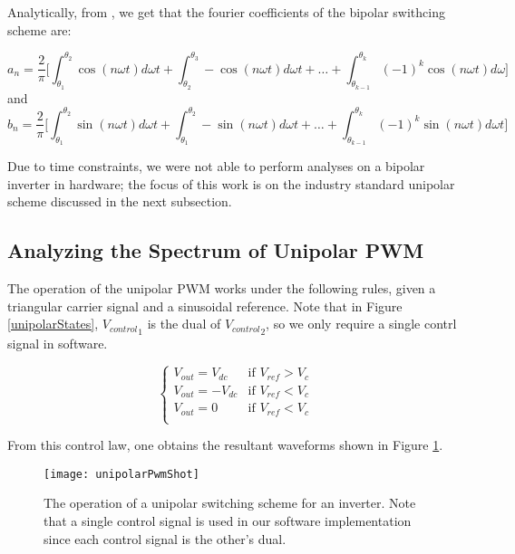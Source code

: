 Analytically, from \cite{fourierAnlaysis}, we get that the fourier coefficients of the bipolar swithcing scheme are:

\begin{equation}
a_n = \frac{2}{\pi} \Big[\int_{\theta_1}^{\theta_2} \cos(n\omega t) d\omega t + \int_{\theta_2}^{\theta_3} -\cos(n\omega t)d\omega t +\ldots +
\int_{\theta_{k-1}}^{\theta_{k}} (-1)^k \cos(n\omega t)d\omega \Big]
\end{equation} 
and 
\begin{equation}
b_n = \frac{2}{\pi} \Big[\int_{\theta_1}^{\theta_2} \sin(n\omega t) d\omega t + \int_{\theta_1}^{\theta_2} -\sin(n\omega t)d\omega t +\ldots +
\int_{\theta_{k-1}}^{\theta_{k}} (-1)^k \sin(n\omega t)d\omega t \Big]
\end{equation} 

Due to time constraints, we were not able to perform analyses on a bipolar inverter in hardware; the focus of this work is on the industry standard unipolar scheme discussed in the next subsection. 

\subsection{Analyzing the Spectrum of Unipolar PWM}
The operation of the unipolar PWM works under the following rules, given a triangular carrier signal and a sinusoidal reference. Note that in Figure \ref{unipolarStates}, ${V_{control}}_{1}$ is the dual of ${V_{control}}_{2}$, so we only require a single contrl signal in software.

\begin{equation}
\label{unipolarStates}
\begin{cases}
V_{out} = V_{dc} &\mbox{if $V_{ref} > V_{c}$}  \\
V_{out} = -V_{dc} &\mbox{if $V_{ref} < V_{c}$}  \\
V_{out} = 0 &\mbox{if $V_{ref} < V_{c}$}  \\
\end{cases}
\end{equation}

From this control law, one obtains the resultant waveforms shown in Figure \ref{unipolarPwmShot}.
\begin{figure}
\centering
\texttt{[image: unipolarPwmShot]}
\caption{The operation of a unipolar switching scheme for an inverter. Note that a single control signal is used in our software implementation since each control signal is the other's dual. \cite{fourierAnalysis}}
\label{unipolarPwmShot}
\end{figure}

